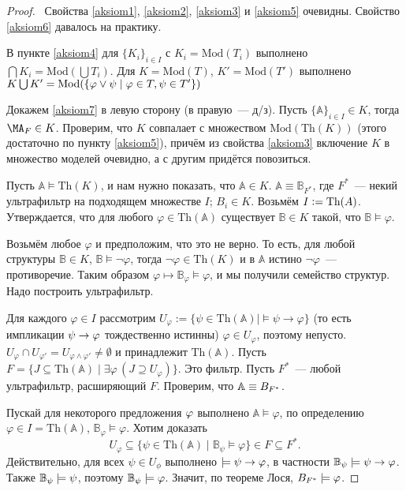 \begin{proof}\
    Свойства \ref{aksiom1}, \ref{aksiom2}, \ref{aksiom3} и \ref{aksiom5} очевидны. Свойство \ref{aksiom6} давалось на практику.

    В пункте \ref{aksiom4} для $\{K_i\}_{i\in I}$ с $K_i=\text{Mod}(T_i)$ выполнено $\bigcap K_i = \text{Mod}(\bigcup T_i)$. Для $K=\text{Mod}(T)$, $K'=\text{Mod}(T')$ выполнено $K\bigcup K' = \text{Mod}(\{\varphi\vee\psi \mid \varphi\in T, \psi\in T'\})$

    Докажем \ref{aksiom7} в левую сторону (в правую~— д/з). Пусть $\{\mathbb{A}\}_{i \in I} \in K$, тогда $\MA_F \in K$. Проверим, что $K$ совпалает с множеством $\text{Mod}(\text{Th}(K))$ (этого достаточно по пункту \ref{aksiom5}), причём из свойства \ref{aksiom3} включение $K$ в множество моделей очевидно, а с другим придётся повозиться.
    
    Пусть $\mathbb{A}\models \text{Th}(K)$, и нам нужно показать, что $\mathbb{A}\in K$. $\mathbb{A}\equiv \mathbb{B}_{F^*}$, где $F^*$~— некий ультрафильтр на подходящем множестве $I$; $B_i \in K$. Возьмём $I\vcentcolon= \text{Th}(A)$. Утверждается, что для любого $\varphi \in \text{Th}(\mathbb{A})$ существует $\mathbb{B} \in K$ такой, что $\mathbb{B} \models \varphi$.  

    Возьмём любое $\varphi$ и предположим, что это не верно. То есть, для любой структуры $\mathbb{B} \in K$, $\mathbb{B} \models \neg \varphi$, тогда $\neg \varphi \in \text{Th}(K)$ и в $\mathbb{A}$ истино $\neg \varphi$~— противоречие. Таким образом $\varphi \mapsto \mathbb{B}_\varphi \models \varphi$, и мы получили семейство структур. Надо построить ультрафильтр.  
    
    Для каждого $\varphi \in I$ рассмотрим $U_{\varphi} := \{\psi \in \text{Th}(\mathbb{A}) | \models \psi \rightarrow \varphi\}$ (то есть импликации $\psi\to\varphi$ тождественно истинны) $\varphi \in U_\varphi$, поэтому непусто. $U_{\varphi} \cap U_{\varphi'} = U_{\varphi \wedge \varphi'} \neq \emptyset$ и принадлежит $\text{Th}(\mathbb{A})$. Пусть $F = \{J \subseteq \text{Th}(\mathbb{A}) \mid \exists \varphi\, (J \supseteq U_\varphi)\}$. Это фильтр. Пусть $F^*$~— любой ультрафильтр, расширяющий $F$. Проверим, что ${\mathbb A}\equiv B_{F^*}$.

    Пускай для некоторого предложения $\varphi$ выполнено $\mathbb{A}\models \varphi$, по определению $\varphi \in I = \text{Th}(\mathbb{A})$, $\mathbb{B}_\varphi \models \varphi$. Хотим доказать
    \[ 
        U_{\varphi} \subseteq \{\psi \in \text{Th}(\mathbb{A}) \mid  \mathbb{B}_{\psi} \models \varphi\} \in F \subseteq F^*.
    \]
    Действительно, для всех $\psi\in U_\phi$ выполнено $\models \psi\to\varphi$, в частности ${\mathbb B}_\psi\models \psi\to\varphi$. Также ${\mathbb B}_\psi\models\psi$, поэтому ${\mathbb B}_\psi\models\varphi$. Значит, по теореме Лося, $B_{F^*}\models \varphi$.
\end{proof}

